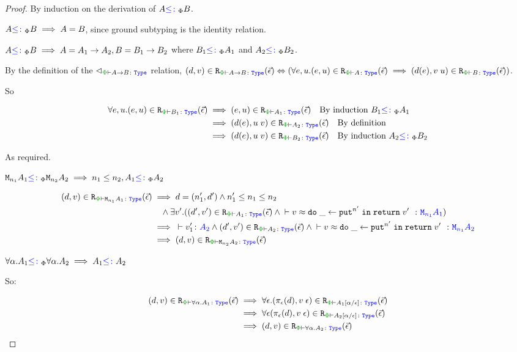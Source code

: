 \documentclass{Report}
\begin{document}
\begin{proof}
    By induction on the derivation of $A{\color{blue} \leq\colon}_\Phi B$.

    \case{\sground}
        $A{\color{blue} \leq\colon}_\Phi B\implies A = B$, since ground subtyping is the identity relation.

    \case{\sfun}
        $A{\color{blue} \leq\colon}_\Phi B\implies A = A_1\rightarrow A_2, B = B_1\rightarrow B_2$ where $B_1{\color{blue} \leq\colon}_\Phi A_1$ and $A_2{\color{blue} \leq\colon}_\Phi B_2$.

        By the definition of the $\relates_{\wellformedt{\P}{\ab}}$ relation, $\inLogRelPE{d}{v}{\ab} \Leftrightarrow (\forall e, u. \inLogRelPE{e}{u}{A}\implies \inLogRelPE{d(e)}{\apply{v}{u}}{B})$.

        So 

        \begin{align*}
            \forall e, u. \inLogRelPE{e}{u}{B_1} & \implies \inLogRelPE{e}{u}{A_1} \qt{By induction $B_1\subtypep A_1$}\\
            & \implies \inLogRelPE{d(e)}{\apply{u}{v}}{A_2}\qt{By definition}\\
            & \implies \inLogRelPE{d(e)}{\apply{u}{v}}{B_2}\qt{By induction $A_2\subtypep B_2$}
        \end{align*}

        As required.
    \case{\seffect}

    $\texttt{M}_{n_1}{A_1} {\color{blue} \leq\colon}_\Phi \texttt{M}_{n_2}{A_2} \implies n_1\leq n_2, A_1{\color{blue} \leq\colon}_\Phi A_2$

    \begin{align*}
        \inLogRelPE{d}{v}{\M{n_1}{A_1}} & \implies  d=(n_1', d') \wedge n_1' \leq n_1\leq n_2 
        \\ & \quad\wedge \exists v'. (\inLogRelPE{d'}{v'}{A_1} \wedge\zberelation{v}{\doin{\_}{\put^{n'}}{\return{v'}}}{\M{n_1}{A_1}})
        \\
        & \implies \ztyperelation{v_1'}{A_2} \wedge \inLogRelPE{d'}{v'}{A_2} \wedge \zberelation{v}{\doin{\_}{\put^{n'}}{\return{v'}}}{\M{n_1}{A_2}}
        \\
        & \implies \inLogRelPE{d}{v}{\M{n_2}{A_2}}
    \end{align*}

    \case{\squant}
    $\forall \alpha. A_1{\color{blue} \leq\colon}_\Phi \forall \alpha. A_2\implies A_1{\color{blue} \leq\colon} A_2$

    So:

    \begin{align*}
        \inLogRelPE{d}{v}{\all{\a}{A_1}} & \implies \forall \e.\inLogRelPE{\pe(d)}{\eapp{v}{\e}}{A_1\ssub{\e}{\a}}\\
        & \implies \forall\e \inLogRelPE{\pe(d)}{\eapp{v}{\e}}{A_2\ssub{\e}{\a}}\\
        & \implies \inLogRelPE{d}{v}{\all{\a}{A_2}}
    \end{align*}
\end{proof}
\end{document}
